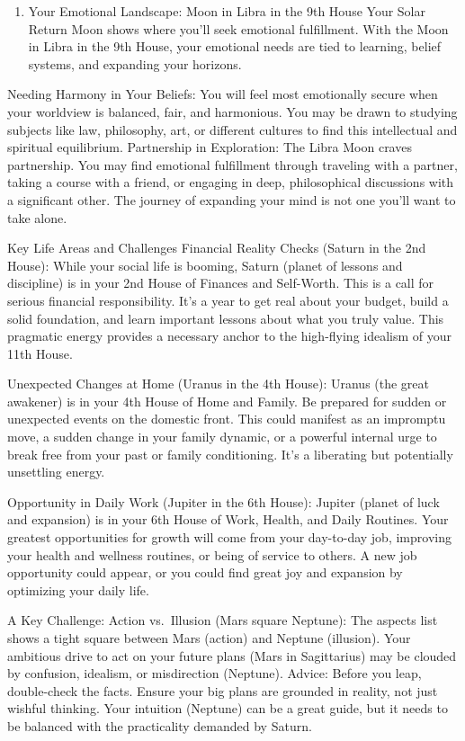 \documentclass{article}
\begin{document}
\begin{enumerate}
\item
  Your Emotional Landscape: Moon in Libra in the 9th House Your Solar Return Moon shows where you'll seek emotional fulfillment. With the Moon in Libra in the 9th House, your emotional needs are tied to learning, belief systems, and expanding your horizons.
\end{enumerate}

Needing Harmony in Your Beliefs: You will feel most emotionally secure when your worldview is balanced, fair, and harmonious. You may be drawn to studying subjects like law, philosophy, art, or different cultures to find this intellectual and spiritual equilibrium. Partnership in Exploration: The Libra Moon craves partnership. You may find emotional fulfillment through traveling with a partner, taking a course with a friend, or engaging in deep, philosophical discussions with a significant other. The journey of expanding your mind is not one you'll want to take alone.

Key Life Areas and Challenges Financial Reality Checks (Saturn in the 2nd House): While your social life is booming, Saturn (planet of lessons and discipline) is in your 2nd House of Finances and Self-Worth. This is a call for serious financial responsibility. It's a year to get real about your budget, build a solid foundation, and learn important lessons about what you truly value. This pragmatic energy provides a necessary anchor to the high-flying idealism of your 11th House.

Unexpected Changes at Home (Uranus in the 4th House): Uranus (the great awakener) is in your 4th House of Home and Family. Be prepared for sudden or unexpected events on the domestic front. This could manifest as an impromptu move, a sudden change in your family dynamic, or a powerful internal urge to break free from your past or family conditioning. It's a liberating but potentially unsettling energy.

Opportunity in Daily Work (Jupiter in the 6th House): Jupiter (planet of luck and expansion) is in your 6th House of Work, Health, and Daily Routines. Your greatest opportunities for growth will come from your day-to-day job, improving your health and wellness routines, or being of service to others. A new job opportunity could appear, or you could find great joy and expansion by optimizing your daily life.

A Key Challenge: Action vs.~Illusion (Mars square Neptune): The aspects list shows a tight square between Mars (action) and Neptune (illusion). Your ambitious drive to act on your future plans (Mars in Sagittarius) may be clouded by confusion, idealism, or misdirection (Neptune). Advice: Before you leap, double-check the facts. Ensure your big plans are grounded in reality, not just wishful thinking. Your intuition (Neptune) can be a great guide, but it needs to be balanced with the practicality demanded by Saturn.
\end{document}

